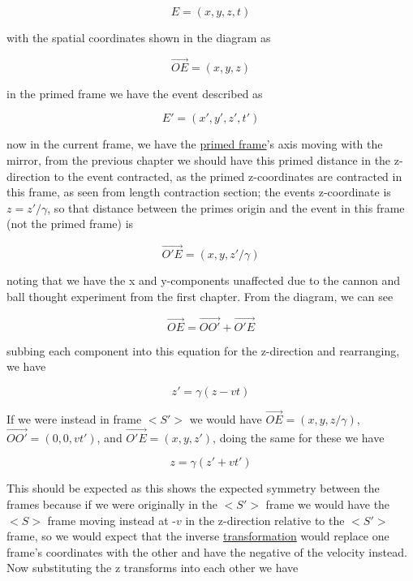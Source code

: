 \begin{equation}
	E = (x,y,z,t)
\end{equation}

with the spatial coordinates shown in the diagram as

\begin{equation}
	\vec{OE}=(x,y,z)
\end{equation}

in the primed frame we have the event described as

\begin{equation}
	E{'} = (x{'},y{'},z{'},t{'})
\end{equation}

now in the current frame, we have the \hyperlink{def-Primed-Frame}{primed frame}'s axis moving with the mirror, from the previous chapter we should have this primed distance in the z-direction to the event contracted, as the primed z-coordinates are contracted in this frame, as seen from length contraction section; the events z-coordinate is $z=z{'}/{\gamma}$, so that distance between the primes origin and the event in this frame (not the primed frame) is

\begin{equation}
	\vec{O{'}E} = (x,y,z{'}/{\gamma})
\end{equation}

noting that we have the x and y-components unaffected due to the cannon and ball thought experiment from the first chapter. From the diagram, we can see

\begin{equation}
	\vec{OE}= \vec{OO{'}} + \vec{O{'}E}
	\label{eq: event}
\end{equation}

subbing each component into this equation for the z-direction and rearranging, we have

\begin{equation}
	z{'} = {\gamma} (z-vt)
\end{equation}

If we were instead in frame ${<\!\!S{'}\!\!>}$ we would have $\vec{OE}=(x,y,z/{\gamma})$, $\vec{OO{'}}=(0,0,vt{'})$, and $\vec{O{'}E} = (x,y,z{'})$, doing the same for these we have

\begin{equation}
	z = {\gamma} (z{'}+vt{'})
\end{equation}

This should be expected as this shows the expected symmetry between the frames because if we were originally in the ${<\!\!S{'}\!\!>}$ frame we would have the ${<\!\!S\!>}$ frame moving instead at -$v$ in the z-direction relative to the ${<\!\!S{'}\!\!>}$ frame, so we would expect that the inverse \hyperlink{def-transform}{transformation} would replace one frame's coordinates with the other and have the negative of the velocity instead.
Now substituting the z transforms into each other we have

